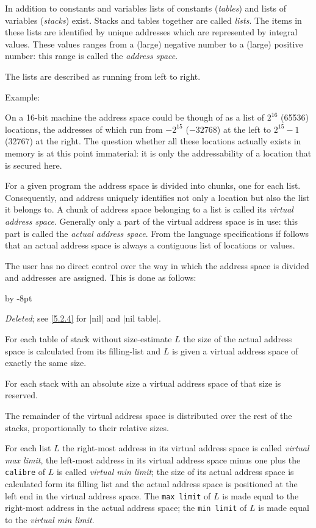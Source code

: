 \documentclass{article}
\newcommand\g[1]{{\sf #1}}
\renewenvironment{itemize}{\begin{list}{}{%
\advance\leftmargin by -8pt%
\setlength\itemsep{0ex plus 0.2ex}%
\setlength\partopsep{3pt}%
\setlength\topsep{2pt plus 2pt}%
\setlength\parsep{0pt plus 2pt}%
}}{\end{list}}
\begin{document}
In addition to constants and variables lists of constants
(\emph{tables}) and lists of variables (\emph{stacks}) exist. Stacks and tables
together are called \emph{lists}. The items in these lists are identified
by unique addresses which are represented by integral values. These values
ranges from a (large) negative number to a (large) positive number:
this range is called the \emph{address space}.

The lists are described as running from left to right.

\smallskip\noindent
Example:

\noindent
On a 16-bit machine the address space could be though of as a list of
$2^{16}$ (65536) locations, the addresses of which run from $-2^{15}$ 
($-32768$) at the left to $2^{15}-1$ (32767) at the right. The question
whether all these locations actually exists in memory is at this point
immaterial: it is only the addressability of a location that is secured
here.

\smallskip

For a given program the address space is divided into chunks, one for each
list. Consequently, and address uniquely identifies not only a location but
also the list it belongs to. A chunk of address space belonging to a list is
called its \emph{virtual address space}. Generally only a part of the
virtual address space is in use: this part is called the \emph{actual
address space}. From the language specifications if follows that an actual
address space is always a contiguous list of locations or values.

The user has no direct control over the way in which the address space is
divided and addresses are assigned. This is done as follows:
\begin{itemize}
\item[a.] \emph{Deleted}; see \ref{5.2.4} for \pp|nil| and \pp|nil table|.
\item[b.] For each table of stack without \g{size-estimate} $L$ the size of
the actual address space is calculated from its \g{filling-list} and $L$ is
given a virtual address space of exactly the same size.
\item[c.] For each stack with an \g{absolute size} a virtual address space
of that size is reserved.
\item[d.] The remainder of the virtual address space is distributed over the
rest of the stacks, proportionally to their \g{relative size}s.
\end{itemize}
For each list $L$ the right-most address in its virtual address
space is called \emph{virtual max limit}, the left-most address in its
virtual address space minus one plus the {\tt calibre} of $L$ is called
\emph{virtual min limit}; the size of its actual address space is calculated
form its \g{filling list} and the actual address space is positioned at the
left end in the virtual address space. The {\tt max limit} of $L$ is made
equal to the right-most address in the actual address space; the
{\tt min limit} of $L$ is made equal to the \emph{virtual min limit}.
\end{document}
